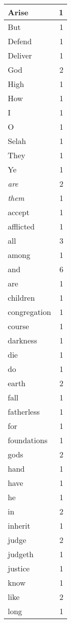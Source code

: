 \begin{center}
\begin{longtable}{l|r}
\hline \hline
\endlastfoot
Arise & 1 \\ \hline
But & 1 \\ \hline
Defend & 1 \\ \hline
Deliver & 1 \\ \hline
God & 2 \\ \hline
High & 1 \\ \hline
How & 1 \\ \hline
I & 1 \\ \hline
O & 1 \\ \hline
Selah & 1 \\ \hline
They & 1 \\ \hline
Ye & 1 \\ \hline
\emph{are} & 2 \\ \hline
\emph{them} & 1 \\ \hline
accept & 1 \\ \hline
afflicted & 1 \\ \hline
all & 3 \\ \hline
among & 1 \\ \hline
and & 6 \\ \hline
are & 1 \\ \hline
children & 1 \\ \hline
congregation & 1 \\ \hline
course & 1 \\ \hline
darkness & 1 \\ \hline
die & 1 \\ \hline
do & 1 \\ \hline
earth & 2 \\ \hline
fall & 1 \\ \hline
fatherless & 1 \\ \hline
for & 1 \\ \hline
foundations & 1 \\ \hline
gods & 2 \\ \hline
hand & 1 \\ \hline
have & 1 \\ \hline
he & 1 \\ \hline
in & 2 \\ \hline
inherit & 1 \\ \hline
judge & 2 \\ \hline
judgeth & 1 \\ \hline
justice & 1 \\ \hline
know & 1 \\ \hline
like & 2 \\ \hline
long & 1 \\ \hline

\end{longtable}
\end{center}
